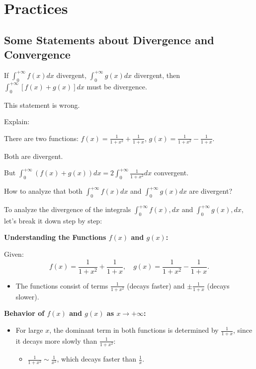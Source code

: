 \documentclass[a4paper,12pt]{book}
\begin{document}
\section{Practices}

\subsection{Some Statements about Divergence and Convergence}

If \( \int_0^{+\infty} f(x) dx\) divergent, \( \int_0^{+\infty} g(x) dx\) divergent, then \( \int_0^{+\infty} \left[ f(x)+g(x) \right] dx\) must be divergence.

This statement is wrong.

Explain:

There are two functions: \( f(x)=\frac{1}{1+x^2} + \frac{1}{1+x} \), \(g(x)=\frac{1}{1+x^2} - \frac{1}{1+x} \).

Both are divergent.

But \(\int_0^{+\infty} (f(x)+g(x))dx = 2\int_0^{+\infty} \frac{1}{1+x^2}dx\) convergent.

How to analyze that both \( \int_0^{+\infty} f(x) dx \) and \( \int_0^{+\infty}  g(x) dx \) are divergent?

To analyze the divergence of the integrals \( \int_0^{+\infty} f(x) , dx \) and \( \int_0^{+\infty} g(x) , dx \), let's break it down step by step:

\hrulefill

\textbf{Understanding the Functions \( f(x) \) and \( g(x) \):}

Given:
\[
f(x) = \frac{1}{1+x^2} + \frac{1}{1+x}, \quad g(x) = \frac{1}{1+x^2} - \frac{1}{1+x}.
\]
\begin{itemize}
\item 
The functions consist of terms \( \frac{1}{1+x^2} \) (decays faster) and \( \pm \frac{1}{1+x} \) (decays slower).

\end{itemize}

\hrulefill

\textbf{Behavior of \( f(x) \) and \( g(x) \) as \( x \to +\infty \):}

\begin{itemize}
\item 
For large \( x \), the dominant term in both functions is determined by \( \frac{1}{1+x} \), since it decays more slowly than \( \frac{1}{1+x^2} \):
\begin{itemize}
\item 
\( \frac{1}{1+x^2} \sim \frac{1}{x^2} \), which decays faster than \( \frac{1}{x} \).

\end{itemize}

\end{itemize}
\end{document}
